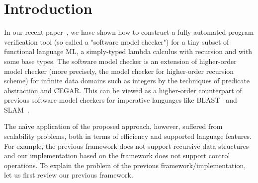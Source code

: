 \section{Introduction}
\label{sec:intro}

In our recent paper~\cite{KobayashiPLDI2011}, we have shown how to
construct a fully-automated program verification tool (so called a
"software model checker") for a tiny subset of functional language ML, a
simply-typed lambda calculus with recursion and with some base types.
The software model checker is an extension of higher-order model checker
(more precisely, the model checker for higher-order recursion scheme)
for infinite data domains such as integers by the techniques of
predicate abstraction and CEGAR.  This can be viewed as a higher-order
counterpart of previous software model checkers for imperative languages
like BLAST~\cite{Henzinger2002} and SLAM~\cite{Ball2002}.

The na\"{\i}ve application of the proposed approach, however, suffered
from scalability problems, both in terms of efficiency and supported
language features. For example, the previous framework does not support
recursive data structures and our implementation based on the framework
does not support control operations.  To explain the problem of the
previous framework/implementation, let us first review our previous
framework.

